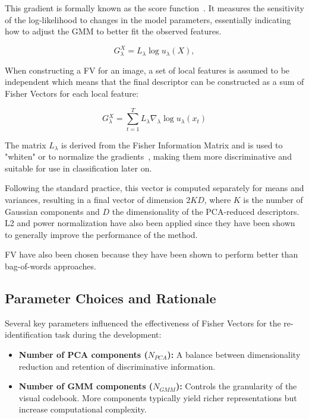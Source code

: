 This gradient is formally known as the score function~\cite{springerSpeciesAgnosticPatterned}. It measures the sensitivity of the log-likelihood to changes in the model parameters, essentially indicating how to adjust the GMM to better fit the observed features. 

\begin{equation}
G_\lambda^X = L_\lambda \log u_\lambda(X),
\end{equation}

When constructing a FV for an image, a set of local features is assumed to be independent which means that the final descriptor can be constructed as a sum of Fisher Vectors for each local feature:~\cite{springerSpeciesAgnosticPatterned}

\begin{equation}
G{_\lambda^{X}} = \sum_{t = 1}^{T} L_{\lambda} \nabla_{\lambda} \log u_{\lambda}(x_t)
\end{equation}

The matrix $L_\lambda$ is derived from the Fisher Information Matrix and is used to "whiten" or to normalize the gradients~\cite{5540009}, making them more discriminative and suitable for use in classification later on.

Following the standard practice, this vector is computed separately for means and variances, resulting in a final vector of dimension $2KD$, where $K$ is the number of Gaussian components and $D$ the dimensionality of the PCA-reduced descriptors. L2 and power normalization have also been applied since they have been shown~\cite{10.1007/978-3-642-15561-1_11} to generally improve the performance of the method.

FV have also been chosen because they have been shown to perform better than bag-of-words approaches.~\cite{5540009}

\subsection{Parameter Choices and Rationale}
\label{sec:parameter_choices}

Several key parameters influenced the effectiveness of Fisher Vectors for the re-identification task during the development:

\begin{itemize}
    \item \textbf{Number of PCA components ($N_{PCA}$):} A balance between dimensionality reduction and retention of discriminative information.
    \item \textbf{Number of GMM components ($N_{GMM}$):} Controls the granularity of the visual codebook. More components typically yield richer representations but increase computational complexity.
\end{itemize}

